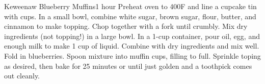 \begin{recipe}{Keweenaw Blueberry Muffins}{}{1 hour}
  Preheat oven to 400\0F and line a cupcake tin with cups.
  In a small bowl, combine white sugar, brown sugar, flour, butter, and
  cinnamon to make topping. Chop together with a fork until crumbly.
  Mix dry ingredients (not topping!) in a large bowl.
  In a 1-cup container, pour oil, egg, and
  enough milk to make 1 cup of liquid. Combine with dry ingredients and mix
  well.
  Fold in blueberries. Spoon mixture into muffin cups, filling  to 
  full. Sprinkle toping as desired, then bake for 25 minutes or until just
  golden and a toothpick comes out cleanly.
\end{recipe}

